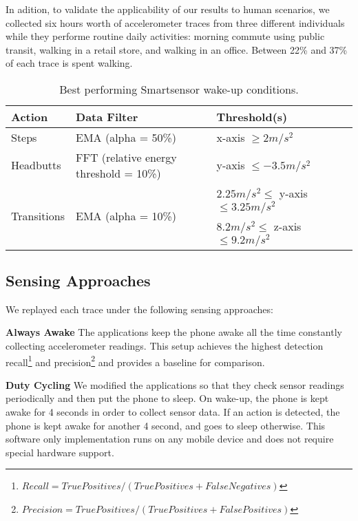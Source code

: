 In adition, to validate the applicability of our results to human
scenarios, we collected six hours worth of accelerometer traces from
three different individuals while they performe routine daily
activities: morning commute using public transit, walking in a retail
store, and walking in an office.  Between 22\% and 37\% of each trace
is spent walking.



\begin{table*}[t]
\centering
{\em
    \begin{tabular}{|l|l|l|l|}
	\hline
    Action      					& Data Filter 									& Threshold(s) \\ \hline
    Steps     					& EMA (alpha = 50\%) 						& x-axis $\geq 2 m/s^2$ 		\\ \hline
	Headbutts   					& FFT (relative energy threshold = 10\%) 	& y-axis $\leq -3.5 m/s^2$ 		\\ \hline
	\multirow{2}{*}{Transitions} 	& \multirow{2}{*}{EMA (alpha = 10\%)}		& $2.25 m/s^2 \leq$ y-axis $\leq 3.25 m/s^2$ 	\\ 
									&												& $8.2 m/s^2 \leq$ z-axis $\leq 9.2 m/s^2$ 	\\ \hline
    \end{tabular}
}
	\caption{Best performing Smartsensor wake-up conditions.}
	\label{table:WUCparameters}
\end{table*}


\subsection{Sensing Approaches}

We replayed each trace under the following sensing approaches:

\textbf{Always Awake} The applications keep the phone awake all the
time constantly collecting accelerometer readings.  This setup
achieves the highest detection
recall\footnote{$Recall=TruePositives/(TruePositives+FalseNegatives)$}
and
precision\footnote{$Precision=TruePositives/(TruePositives+FalsePositives)$}
and provides a baseline for comparison.

\textbf{Duty Cycling} We modified the applications so that they check
sensor readings periodically and then put the phone to sleep.  On
wake-up, the phone is kept awake for 4 seconds in order to collect
sensor data.  If an action is detected, the phone is kept awake for
another 4 second, and goes to sleep otherwise.  This software only
implementation runs on any mobile device and does not require special
hardware support.

